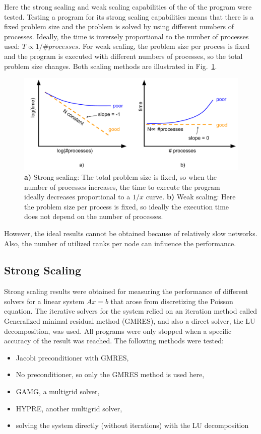 Here the strong scaling and weak scaling capabilities of the of the program were tested. Testing a program for its strong scaling capabilities means that there is a fixed problem size and the problem is solved by using different numbers of processes. Ideally, the time is inversely proportional to the number of processes used: $T \propto 1/\textit{\#processes}$. For weak scaling, the problem size per process is fixed and the program is executed with different numbers of processes, so the total problem size changes. Both scaling methods are illustrated in Fig.~\ref{fig:strong_weak_scaling}.


\begin{figure}[tb]
	\centering
\hspace*{-7mm}	\includegraphics[width=1.\textwidth]{4_strong_weak_scaling}
	\caption{\textbf{a)} Strong scaling: The total problem size is fixed, so when the number of processes increases, the time to execute the program ideally decreases proportional to a $1/x$ curve. \textbf{b)} Weak scaling: Here the problem size per process is fixed, so ideally the execution time does not depend on the number of processes.}
	\label{fig:strong_weak_scaling}
\end{figure}

However, the ideal results cannot be obtained because of relatively slow networks. Also, the number of utilized ranks per node can influence the performance.

\subsection{Strong Scaling}


Strong scaling results were obtained for measuring the performance of different solvers for a linear system $Ax = b$ that arose from discretizing the Poisson equation. The iterative solvers for the system relied on an iteration method called Generalized minimal residual method (GMRES), and also a direct solver, the LU decomposition, was used. All programs were only stopped when a specific accuracy of the result was reached. The following methods were tested:
\begin{itemize}
\item Jacobi preconditioner with GMRES,
\item No preconditioner, so only the GMRES method is used here,
\item GAMG, a multigrid solver,
\item HYPRE, another multigrid solver,
\item solving the system directly (without iterations) with the LU decomposition
\end{itemize}


